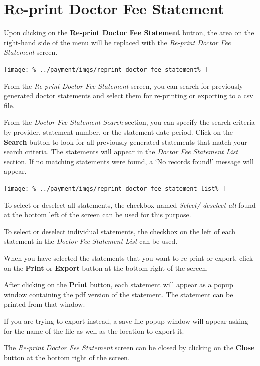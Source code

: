 \documentclass[../main/main]{subfiles}
\begin{document}
\newpage
\section{Re-print Doctor Fee Statement}
\label{sec:re-print-doctor-fee-statement}

Upon clicking on the \textbf{Re-print Doctor Fee Statement} button,
the area on the right-hand side of the menu will be replaced with the
\emph{Re-print Doctor Fee Statement} screen.

\texttt{[image: \%
  ../payment/imgs/reprint-doctor-fee-statement\%
]}

From the \emph{Re-print Doctor Fee Statement} screen, you can search for
previously generated doctor statements and select them for re-printing or
exporting to a csv file.

From the \emph{Doctor Fee Statement Search} section, you can specify the search
criteria by provider, statement number, or the statement date period. Click
on the \textbf{Search} button to look for all previously generated statements
that match your search criteria. The statements will appear in the
\emph{Doctor Fee Statement List} section.
If no matching statements were found, a `No records found!' message will appear.

\texttt{[image: \%
  ../payment/imgs/reprint-doctor-fee-statement-list\%
]}

To select or deselect all statements, the checkbox named \emph{Select/ deselect
all} found at the bottom left of the screen can be used for this purpose.

To select or deselect individual statements, the checkbox on the left of each
statement in the \emph{Doctor Fee Statement List} can be used.

When you have selected the statements that you want to re-print or export,
click on the \textbf{Print} or \textbf{Export} button at the bottom right of the
screen.

After clicking on the \textbf{Print} button, each statement will appear as a
popup window containing the pdf version of the statement.
The statement can be printed from that window.

If you are trying to export instead, a save file popup window will appear asking
for the name of the file as well as the location to export it.

The \emph{Re-print Doctor Fee Statement} screen can be closed by clicking on the
\textbf{Close} button at the bottom right of the screen.
\end{document}
